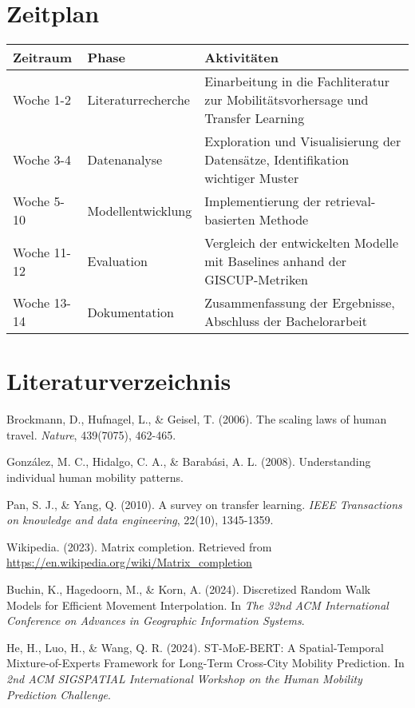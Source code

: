 \documentclass[a4paper,12pt]{article}
\begin{document}
\section{Zeitplan}

\begin{tabular}{p{2.5cm}|p{3.5cm}|p{8cm}}
\toprule
\textbf{Zeitraum} & \textbf{Phase} & \textbf{Aktivitäten} \\
\midrule
Woche 1-2 & Literaturrecherche & Einarbeitung in die Fachliteratur zur Mobilitätsvorhersage und Transfer Learning \\
\midrule
Woche 3-4 & Datenanalyse & Exploration und Visualisierung der Datensätze, Identifikation wichtiger Muster \\
\midrule
Woche 5-10 & Modellentwicklung & Implementierung der retrieval-basierten Methode \\
\midrule
Woche 11-12 & Evaluation & Vergleich der entwickelten Modelle mit Baselines anhand der GISCUP-Metriken \\
\midrule
Woche 13-14 & Dokumentation & Zusammenfassung der Ergebnisse, Abschluss der Bachelorarbeit \\
\bottomrule
\end{tabular}

\section{Literaturverzeichnis}

Brockmann, D., Hufnagel, L., \& Geisel, T. (2006). The scaling laws of human travel. \textit{Nature}, 439(7075), 462-465.

González, M. C., Hidalgo, C. A., \& Barabási, A. L. (2008). Understanding individual human mobility patterns.

Pan, S. J., \& Yang, Q. (2010). A survey on transfer learning. \textit{IEEE Transactions on knowledge and data engineering}, 22(10), 1345-1359.

Wikipedia. (2023). Matrix completion. Retrieved from \url{https://en.wikipedia.org/wiki/Matrix_completion}

Buchin, K., Hagedoorn, M., \& Korn, A. (2024). Discretized Random Walk Models for Efficient Movement Interpolation. In \textit{The 32nd ACM International Conference on Advances in Geographic Information Systems}.

He, H., Luo, H., \& Wang, Q. R. (2024). ST-MoE-BERT: A Spatial-Temporal Mixture-of-Experts Framework for Long-Term Cross-City Mobility Prediction. In \textit{2nd ACM SIGSPATIAL International Workshop on the Human Mobility Prediction Challenge}.
\end{document}
